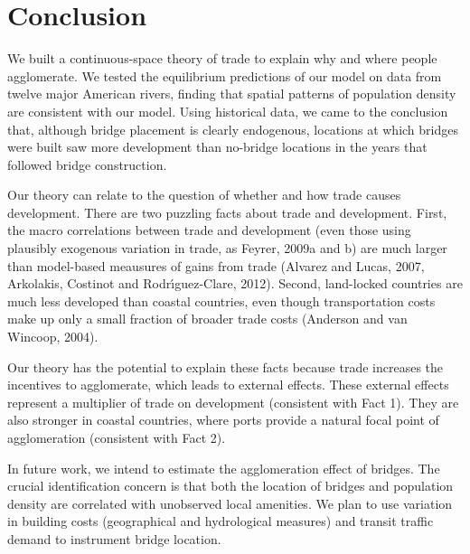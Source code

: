\documentclass[12pt]{article}
\begin{document}


\section{Conclusion}

We built a continuous-space theory of trade to explain why and where people
agglomerate. We tested the equilibrium predictions of our model on data from
twelve major American rivers, finding that spatial patterns of population
density are consistent with our model. Using historical data, we came to the 
conclusion that, although bridge placement is clearly endogenous, locations 
at which bridges were built saw more development than no-bridge locations in 
the years that followed bridge construction.

Our theory can relate to the question of whether and how trade causes
development. There are two puzzling facts about trade and development.
First, the macro correlations between trade and development (even those
using plausibly exogenous variation in trade, as Feyrer, 2009a and b) are
much larger than model-based meausures of gains from trade (Alvarez and
Lucas, 2007, Arkolakis, Costinot and Rodr\'{\i}guez-Clare, 2012). Second,
land-locked countries are much less developed than coastal countries, even
though transportation costs make up only a small fraction of broader trade
costs (Anderson and van Wincoop, 2004).

Our theory has the potential to explain these facts because trade increases
the incentives to agglomerate, which leads to external effects. These
external effects represent a multiplier of trade on development (consistent
with Fact 1). They are also stronger in coastal countries, where ports
provide a natural focal point of agglomeration (consistent with Fact 2).

In future work, we intend to estimate the agglomeration effect of bridges. The crucial identification concern is that both the location of bridges and population density are correlated with unobserved local amenities. We plan to use variation in building costs (geographical and hydrological measures) and transit traffic demand to instrument bridge location. 
\end{document}
